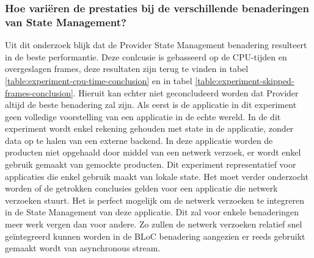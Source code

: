\subsubsection{Hoe variëren de prestaties bij de verschillende benaderingen van State Management?}

Uit dit onderzoek blijk dat de Provider State Management benadering resulteert in de beste performantie. Deze conlcusie is gebasseerd op de CPU-tijden en overgeslagen frames, deze resultaten zijn terug te vinden in tabel \ref{table:experiment-cpu-time-conclusion} en in tabel \ref{table:experiment-skipped-frames-conclusion}. Hieruit kan echter niet geconcludeerd worden dat Provider altijd de beste benadering zal zijn. \newline \newline
Als eerst is de applicatie in dit experiment geen volledige voorstelling van een applicatie in de echte wereld. In de dit experiment wordt enkel rekening gehouden met state in de applicatie, zonder data op te halen van een externe backend. In deze applicatie worden de producten niet opgehaald door middel van een netwerk verzoek, er wordt enkel gebruik gemaakt van gemockte producten. Dit experiment representatief voor applicaties die enkel gebruik maakt van lokale state. Het moet verder onderzocht worden of de getrokken conclusies gelden voor een applicatie die netwerk verzoeken stuurt. \newline
Het is perfect mogelijk om de netwerk verzoeken te integreren in de State Management van deze applicatie. Dit zal voor enkele benaderingen meer werk vergen dan voor andere. Zo zullen de netwerk verzoeken relatief snel geïntegreerd kunnen worden in de BLoC benadering aangezien er reeds gebruikt gemaakt wordt van asynchronous stream. \newline 

